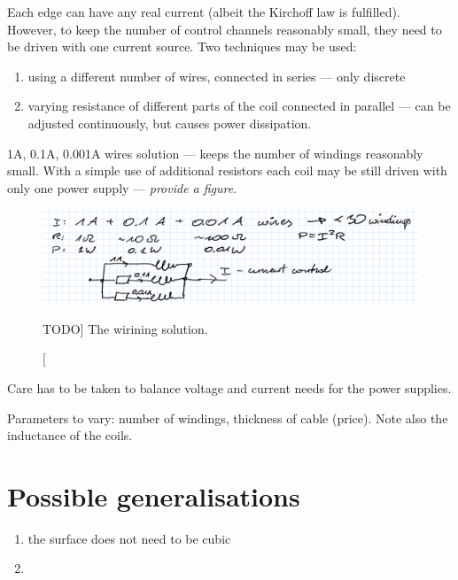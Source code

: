 Each edge can have any real current (albeit the Kirchoff law is fulfilled).
However, to keep the number of control channels reasonably small, they need
to be driven with one current source. Two techniques may be used:
\begin{enumerate}
  \item using a different number of wires, connected in series --- only discrete
  \item varying resistance of different parts of the coil connected in parallel
  --- can be adjusted continuously, but causes power dissipation.
\end{enumerate}

1A, 0.1A, 0.001A wires solution --- keeps the number of windings reasonably small.
With a simple use of additional resistors each coil may be still driven with only
one power supply --- \emph{provide a figure}.

\begin{figure}
  \centering
  \includegraphics[width=.6\linewidth]{gfx/coils/current_discretisation}
  \caption
  [TODO]
  {%
The wirining solution.}
  \label{fig:coils_current_discretisation}
\end{figure}

Care has to be taken to balance voltage and current needs for the power supplies.

Parameters to vary: number of windings, thickness of cable (price). Note also
the inductance of the coils.

\section{Possible generalisations}
\begin{enumerate}
  \item the surface does not need to be cubic
  \item
\end{enumerate}




